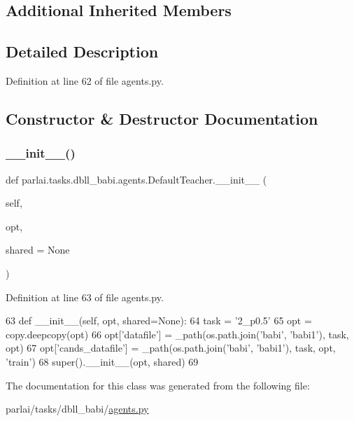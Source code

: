 \subsection*{Additional Inherited Members}


\subsection{Detailed Description}


Definition at line 62 of file agents.\+py.



\subsection{Constructor \& Destructor Documentation}
\mbox{\label{classparlai_1_1tasks_1_1dbll__babi_1_1agents_1_1DefaultTeacher_ab7d8ee5ef045a12162f79ec74898bca0}} 
\subsubsection{\texorpdfstring{\+\_\+\+\_\+init\+\_\+\+\_\+()}{\_\_init\_\_()}}
{\footnotesize\ttfamily def parlai.\+tasks.\+dbll\+\_\+babi.\+agents.\+Default\+Teacher.\+\_\+\+\_\+init\+\_\+\+\_\+ (\begin{DoxyParamCaption}\item[{}]{self,  }\item[{}]{opt,  }\item[{}]{shared = {\ttfamily None} }\end{DoxyParamCaption})}



Definition at line 63 of file agents.\+py.


\begin{DoxyCode}
63     \textcolor{keyword}{def }\_\_init\_\_(self, opt, shared=None):
64         task = \textcolor{stringliteral}{'2\_p0.5'}
65         opt = copy.deepcopy(opt)
66         opt[\textcolor{stringliteral}{'datafile'}] = \_path(os.path.join(\textcolor{stringliteral}{'babi'}, \textcolor{stringliteral}{'babi1'}), task, opt)
67         opt[\textcolor{stringliteral}{'cands\_datafile'}] = \_path(os.path.join(\textcolor{stringliteral}{'babi'}, \textcolor{stringliteral}{'babi1'}), task, opt, \textcolor{stringliteral}{'train'})
68         super().\_\_init\_\_(opt, shared)
69 \end{DoxyCode}


The documentation for this class was generated from the following file\+:\begin{DoxyCompactItemize}
\item 
parlai/tasks/dbll\+\_\+babi/\hyperlink{parlai_2tasks_2dbll__babi_2agents_8py}{agents.\+py}\end{DoxyCompactItemize}
